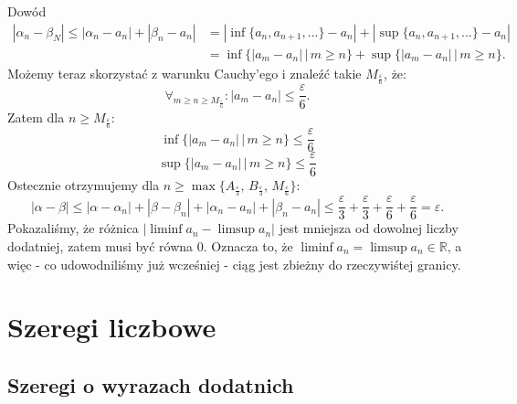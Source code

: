 \documentclass{article}
\numberwithin{defi}{section}
\numberwithin{theo}{section}
\numberwithin{defi}{section}
\newcommand{\R}{\mathbb{R}}
\newcommand{\eps}{\varepsilon}
\begin{document}
\begin{dow}{Dowód}
\begin{equation}
\begin{split}
            |\alpha_n - \beta_N| \leqslant |\alpha_n - a_n| + |\beta_n - a_n| & = |\inf\{a_n, a_{n+1}, ...\} - a_n| + |\sup\{a_n, a_{n+1}, ...\} - a_n| \\
            & = \inf\{ |a_m - a_n| \, \big| \, m \geqslant n \} + \sup\{ |a_m - a_n| \, \big| \, m \geqslant n \}.
        \end{split} \end{equation}
    Możemy teraz skorzystać z warunku Cauchy'ego i znaleźć takie $M_{\frac{\eps}{6}}$, że: \begin{equation}
        \forall_{m \geqslant n \geqslant M_{\frac{\eps}{6}}}: |a_m - a_n| \leqslant \frac{\eps}{6}.
    \end{equation} Zatem dla $n \geqslant M_{\frac{\eps}{6}}$:\begin{equation}
        \inf\{ |a_m - a_n| \, \big| \, m \geqslant n \} \leqslant \frac{\eps}{6}
    \end{equation} \begin{equation}
        \sup\{ |a_m - a_n| \, \big| \, m \geqslant n \} \leqslant \frac{\eps}{6}
    \end{equation}
    Ostecznie otrzymujemy dla $n \geqslant \max \{A_{\frac{\eps}{3}}, \, B_{\frac{\eps}{3}}, \, M_{\frac{\eps}{6}}\}$: \begin{equation}
        |\alpha - \beta| \leqslant |\alpha - \alpha_n| + |\beta - \beta_n| +  |\alpha_n - a_n| + |\beta_n - a_n| \leqslant \frac{\eps}{3} + \frac{\eps}{3} + \frac{\eps}{6} + \frac{\eps}{6} = \eps.
    \end{equation}
    Pokazaliśmy, że różnica $|\liminf a_n - \limsup a_n|$ jest mniejsza od dowolnej liczby dodatniej, zatem musi być równa $0$. Oznacza to, że $\liminf a_n = \limsup a_n \in \R$, a więc - co udowodniliśmy już wcześniej - ciąg jest zbieżny do rzeczywiśtej granicy.
\end{dow}



\section{Szeregi liczbowe}
\subsection{Szeregi o wyrazach dodatnich}
\end{document}
